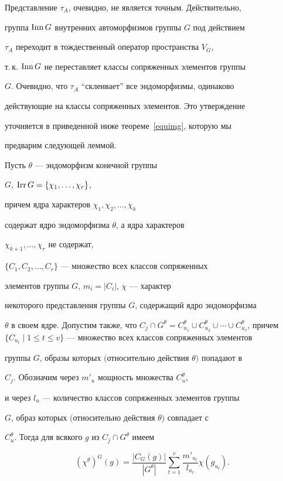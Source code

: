 Представление $\tau_{A}$, очевидно, не является точным. Действительно,


группа $\operatorname{Inn} G$ внутренних автоморфизмов группы $G$ под действием


$\tau_{A}$ переходит в тождественный оператор пространства $V_{G}$,


т.\,к. $\operatorname{Inn} G$ не переставляет классы сопряженных элементов группы


$G$. Очевидно, что $\tau_{A}$ ``склеивает'' все эндоморфизмы, одинаково


действующие на классы сопряженных элементов. Это утверждение


уточняется в приведенной ниже теореме~\ref{equimg}, которую мы


предварим следующей леммой.





\begin{lem}\label{TG}


Пусть $\theta$ --- эндоморфизм конечной группы


$G$, $\operatorname{Irr}{G}= \{\chi_{1}, \dotsc, \chi_{r}\}$,


причем ядра характеров $\chi_{1},\chi_{2},\dotsc,\chi_{k}$


содержат ядро эндоморфизма $\theta$, а ядра характеров


$\chi_{k+1},\dotsc,\chi_{r}$ не содержат,


$\{C_{1},C_{2},\dotsc,C_{r}\}$ --- множество всех классов сопряженных


элементов группы $G$, $m_{i}=|C_{i}|$, $\chi$ --- характер


некоторого представления группы $G$, содержащий ядро эндоморфизма


$\theta$ в своем ядре. Допустим также, что $C_{j}\cap


G^{\theta}= C^{\theta}_{u_{1}}\cup C^{\theta}_{u_{2}}\cup\dotsb\cup


C^{\theta}_{u_{v}}$, причем $\{C_{u_{t}}\mid


1\le t\le v\}$ --- множество всех классов сопряженных элементов


группы $G$, образы которых $($относительно действия $\theta)$ попадают в


$C_{j}$. Обозначим через $m'_{u}$ мощность множества $C^{\theta}_{u}$,


и через $l_{u}$ --- количество классов сопряженных элементов группы


$G$, образ которых $($относительно действия $\theta)$ совпадает с


$C^{\theta}_{u}$. Тогда для всякого $g$ из $C_{j}\cap G^{\theta}$ имеем


$$


(\chi^{\theta})^{G}(g)=\frac{|C_{G}(g)|}{|G^{\theta}|}


\sum\limits^{v}_{t=1} \frac{m'_{u_{t}}}{l_{u_{t}}} \chi(g_{u_{t}}).


$$


\end{lem}





